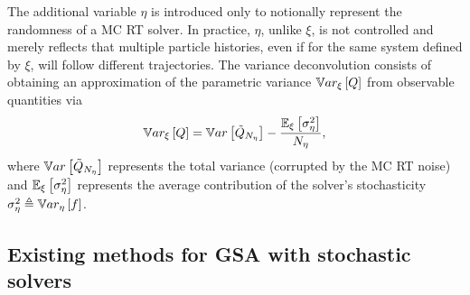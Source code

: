 The additional variable $\eta$ is introduced only to notionally represent the randomness of a MC RT solver. In practice, $\eta$, unlike $\xi$, is not controlled and merely reflects that multiple particle histories, even if for the same system defined by $\xi$, will follow different trajectories. The variance deconvolution consists of %
obtaining an approximation of the parametric variance $\mathbb{V}ar_\xi\left[Q\right]$ from observable quantities via%
\begin{equation}\label{eq:var-deconv}
 \mathbb{V}ar_\xi\left[Q\right] = \mathbb{V}ar\left[\tilde{Q}_{N_\eta}\right] - \frac{\mathbb{E}_\xi\left[ \sigma^2_\eta \right]}{{N_\eta}},
\end{equation}
where $\mathbb{V}ar\left[\tilde{Q}_{N_\eta}\right]$ represents the total variance (corrupted by the MC RT noise) and $\mathbb{E}_\xi\left[ \sigma^2_\eta \right]$ represents the average contribution of the solver's stochasticity $
\sigma^2_\eta\triangleq \mathbb{V}ar_\eta\left[ f \right]$. %
% 

\subsection{Existing methods for GSA with stochastic solvers}
